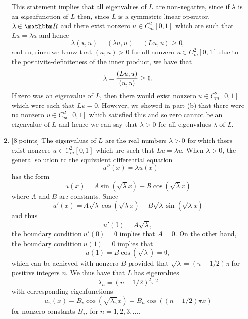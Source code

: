 \begin{solution}
\begin{enumerate}
          This statement implies that all eigenvalues of $L$ are non-negative, since if $\lambda$ is an eigenfunction of $L$ then, since $L$ is a symmetric linear operator, $\lambda\in\R$ and there exist nonzero $u\in C_m^2[0,1]$ which are such that $Lu=\lambda u$ and hence
           \[ \lambda (u, u) = (\lambda u, u) = (L u, u) \ge 0,\]
          and so, since we know that $(u,u)>0$ for all nonzero $u\in C_m^2[0,1]$ due to the positivite-definiteness
          of the inner product, we have that
\[
\lambda = {(L u, u) \over (u, u)}\ge 0.
\]
If zero was an eigenvalue of $L$, then there would exist nonzero $u\in C_m^2[0,1]$ which were such that $Lu=0$. However, we showed in part (b) that there were no nonzero $u\in C_m^2[0,1]$ which satisfied this and so zero cannot be an eigenvalue of $L$ and hence we can say that $\lambda > 0$ for all eigenvalues $\lambda$ of $L$.

\item  {[8 points]} The eigenvalues of $L$ are the real numbers $\lambda>0$ for which there exist nonzero $u\in C_m^2[0,1]$ which are such that $L u = \lambda u$.  When $\lambda>0$, the general solution to the equivalent
        differential equation
                   \[  -u'' (x) = \lambda u(x)\]
        has the form
                   \[ u(x) = A \sin(\sqrt{\lambda} x) + B \cos(\sqrt{\lambda}x)\]
        where $A$ and $B$ are constants. Since
                    \[ u'(x) = A\sqrt{\lambda} \cos(\sqrt{\lambda}x)
                               - B \sqrt{\lambda} \sin(\sqrt{\lambda}x)\]
        and thus
                    \[ u'(0) = A \sqrt{\lambda},\]
        the boundary condition $u'(0) = 0$ implies that $A=0$.
        On the other hand, the boundary condition $u(1) = 0$ implies that
                    \[ u(1) = B \cos(\sqrt{\lambda}) = 0,\]
        which can be achieved with nonzero $B$ provided that 
        $\sqrt{\lambda} = (n-1/2)\pi$ for positive integers $n$.
        We thus have that $L$ has eigenvalues
                    \[ \lambda_n = (n-1/2)^2 \pi^2\]
        with corresponding eigenfunctions
                    \[ u_n(x) = B_n\cos(\sqrt{\lambda_n} x) = B_n\cos((n-1/2)\pi x)\]
for nonzero constants $B_n$, for $n=1,2,3,\ldots$.
\end{enumerate}
\end{solution}